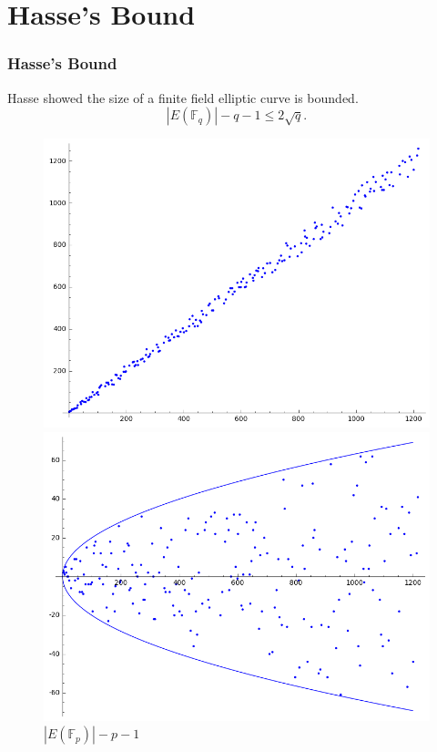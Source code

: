 \documentclass{beamer}
\newcommand{\F}{\mathbb{F}}
\begin{document}
\section{Hasse's Bound}
\begin{frame}
\frametitle{Hasse's Bound}
Hasse showed the size of a finite 
field elliptic curve is bounded. 
\[ |E(\F_q)| - q - 1 \leq 2 \sqrt q. \]
\begin{figure}[H]
\begin{minipage}[b]{.45\linewidth}
\centering
\includegraphics[width=\textwidth]{hasse-bound1}
\caption{$|E(\F_p)|$}
\end{minipage}
\hspace{.5cm}
\begin{minipage}[b]{.45\linewidth}
\centering
\includegraphics[width=\textwidth]{hasse-bound2}
\caption{$|E(\F_p)| - p - 1$}
\end{minipage}
\end{figure}
\end{frame}
\end{document}
